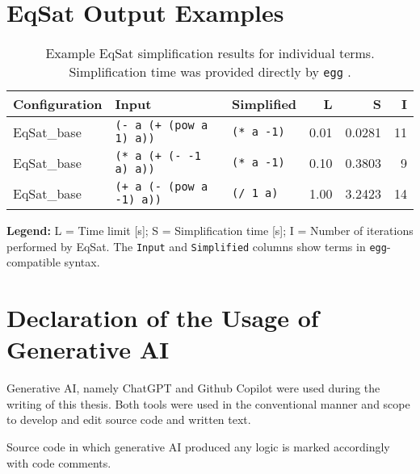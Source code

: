 \section{EqSat Output Examples}
\label{app:eqsat_examples}
\begin{table}[h]
	\centering
	\caption{Example EqSat simplification results for individual terms. Simplification time was provided directly by \texttt{egg} \citep{Willsey_2021}.}
	\label{tab:eqsat_example_terms}
	\begin{tabular}{l l l r r r}
		\toprule
		\textbf{Configuration} & \textbf{Input} & \textbf{Simplified} & \textbf{L} & \textbf{S} & \textbf{I} \\
		\midrule
		EqSat\_base & \texttt{(- a (+ (pow a 1) a))} & \texttt{(* a -1)} & 0.01 & 0.0281 & 11 \\
		EqSat\_base & \texttt{(* a (+ (- -1 a) a))} & \texttt{(* a -1)} & 0.10 & 0.3803 & 9 \\
		EqSat\_base & \texttt{(+ a (- (pow a -1) a))} & \texttt{(/ 1 a)} & 1.00 & 3.2423 & 14 \\
		\bottomrule
	\end{tabular}
	
	\vspace{2mm}
	\raggedright
	\footnotesize
	\textbf{Legend:}
	L = Time limit [s]; 
	S = Simplification time [s]; 
	I = Number of iterations performed by EqSat. 
	The \texttt{Input} and \texttt{Simplified} columns show terms in \texttt{egg}-compatible syntax.
\end{table}

\newpage
\section{Declaration of the Usage of Generative AI}

Generative AI, namely ChatGPT and Github Copilot were used during the writing of this thesis. Both tools were used in the conventional manner and scope to develop and edit source code and written text. 

Source code in which generative AI produced any logic is marked accordingly with code comments.
\newpage